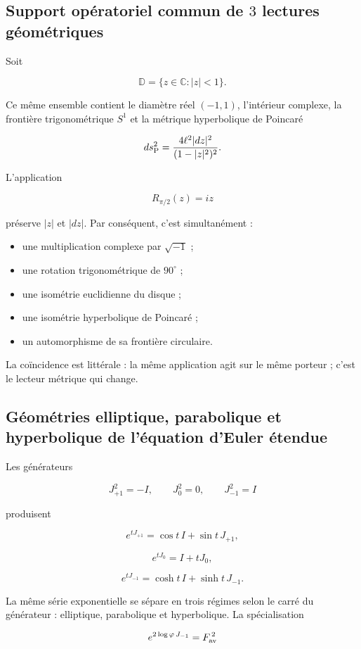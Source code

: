 \subsection{Support opératoriel commun de \(3\) lectures géométriques}

Soit

\[
\mathbb D=\{z\in\mathbb C:|z|<1\}.
\]

Ce même ensemble contient le diamètre réel \((-1,1)\), l’intérieur complexe, la frontière trigonométrique \(S^1\) et la métrique hyperbolique de Poincaré

\[
ds_{\rm P}^2=\frac{4\ell^2|dz|^2}{(1-|z|^2)^2}.
\]

L'application

\[
R_{\pi/2}(z)=iz
\]

préserve \(|z|\) et \(|dz|\). Par conséquent, c’est simultanément :

\begin{itemize}
\item une multiplication complexe par \(\sqrt{-1}\) ;
\item une rotation trigonométrique de \(90^\circ\) ;
\item une isométrie euclidienne du disque ;
\item une isométrie hyperbolique de Poincaré ;
\item un automorphisme de sa frontière circulaire.
\end{itemize}

La coïncidence est littérale : la même application agit sur le même porteur ; c’est le lecteur métrique qui change.

\subsection{Géométries elliptique, parabolique et hyperbolique de l’équation d’Euler étendue}

Les générateurs

\[
J_{+1}^2=-I,\qquad
J_0^2=0,\qquad
J_{-1}^2=I
\]

produisent

\[
e^{tJ_{+1}}=\cos t\,I+\sin t\,J_{+1},
\]

\[
e^{tJ_0}=I+tJ_0,
\]

\[
e^{tJ_{-1}}=\cosh t\,I+\sinh t\,J_{-1}.
\]

La même série exponentielle se sépare en trois régimes selon le carré du générateur : elliptique, parabolique et hyperbolique. La spécialisation

\[
e^{2\log\varphi\,J_{-1}}=F_{\rm av}^{\,2}
\]

